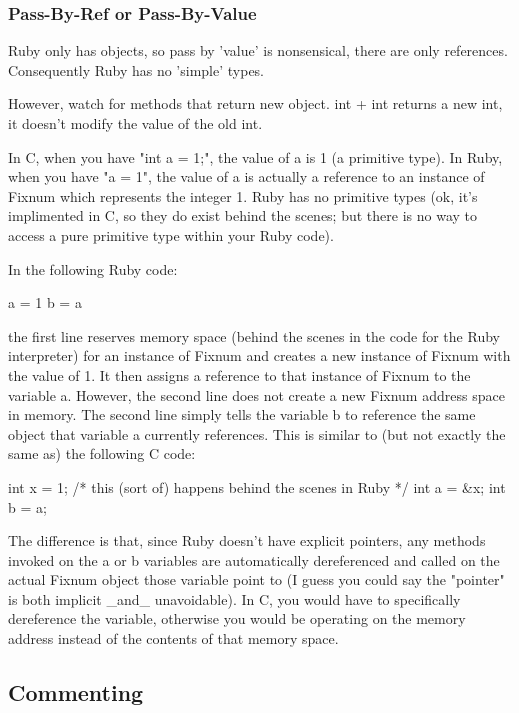 \documentclass[10pt,twoside,a4paper]{article}
\begin{document}
\subsubsection{Pass-By-Ref or Pass-By-Value}

Ruby only has objects, so pass by 'value' is nonsensical, there are only references. Consequently Ruby has no 'simple' types.

However, watch for methods that return new object. int + int returns a new int, it doesn't modify the value of the old int.

In C, when you have "int a = 1;", the value of a is 1 (a primitive type). In Ruby, when you have "a = 1", the value of a is actually a reference to an instance of Fixnum which represents the integer 1. Ruby has no primitive types (ok, it's implimented in C, so they do exist behind the scenes; but there is no way to access a pure primitive type within your Ruby code).

In the following Ruby code:

  a = 1
  b = a

the first line reserves memory space (behind the scenes in the code for the Ruby interpreter) for an instance of Fixnum and creates a new instance of Fixnum with the value of 1. It then assigns a reference to that instance of Fixnum to the variable a. However, the second line does not create a new Fixnum address space in memory. The second line simply tells the variable b to reference the same object that variable a currently references. This is similar to (but not exactly the same as) the following C code:

  int x = 1; /* this (sort of) happens behind the scenes in Ruby */
  int a = &x;
  int b = a;

The difference is that, since Ruby doesn't have explicit pointers, any methods invoked on the a or b variables are automatically dereferenced and called on the actual Fixnum object those variable point to (I guess you could say the "pointer" is both implicit _and_ unavoidable). In C, you would have to specifically dereference the variable, otherwise you would be operating on the memory address instead of the contents of that memory space.






\subsection{Commenting}

\begin{verbatim}
\end{verbatim}
\end{document}
